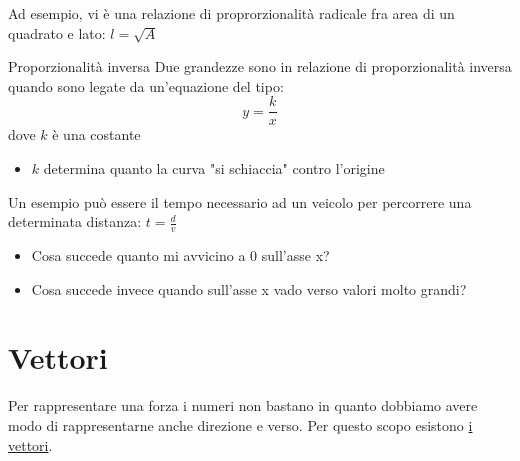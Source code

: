 Ad esempio, vi è una relazione di proprorzionalità radicale fra area di un quadrato e lato: $ l = \sqrt{A} $
\begin{definizione}{Proporzionalità inversa}
	Due grandezze sono in relazione di proporzionalità inversa quando sono legate da un'equazione del tipo:
	\[
		y = \frac{k}{x}
	\]
	dove $ k $ è una costante
	\vskip3mm
	\begin{minipage}[c]{0.48\textwidth}
	\end{minipage}
	\begin{minipage}[c]{0.48\textwidth}
		\begin{itemize}
			\item $ k $ determina quanto la curva "si schiaccia" contro l'origine
		\end{itemize}
	\end{minipage}
\end{definizione}
Un esempio può essere il tempo necessario ad un veicolo per percorrere una determinata distanza: $ t = \frac{d}{v} $

\begin{itemize}
	\item Cosa succede quanto mi avvicino a 0 sull'asse x?
	\item Cosa succede invece quando sull'asse x vado verso valori molto grandi?
\end{itemize}
\section{Vettori}
Per rappresentare una forza i numeri non bastano in quanto dobbiamo avere modo di rappresentarne anche direzione e verso. Per questo scopo esistono \underline{i vettori}.
\begin{center}
\end{center}
